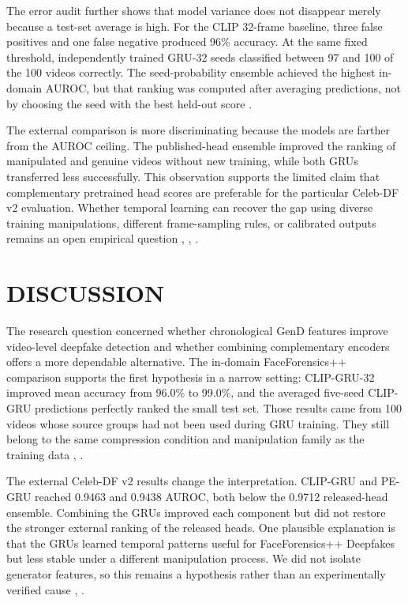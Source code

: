\documentclass[conference,10pt]{IEEEtran}
\begin{document}
The error audit further shows that model variance does not disappear merely because a test-set average is high. For the CLIP 32-frame baseline, three false positives and one false negative produced 96\% accuracy. At the same fixed threshold, independently trained GRU-32 seeds classified between 97 and 100 of the 100 videos correctly. The seed-probability ensemble achieved the highest in-domain AUROC, but that ranking was computed after averaging predictions, not by choosing the seed with the best held-out score \cite{capstone2026}.

The external comparison is more discriminating because the models are farther from the AUROC ceiling. The published-head ensemble improved the ranking of manipulated and genuine videos without new training, while both GRUs transferred less successfully. This observation supports the limited claim that complementary pretrained head scores are preferable for the particular Celeb-DF v2 evaluation. Whether temporal learning can recover the gap using diverse training manipulations, different frame-sampling rules, or calibrated outputs remains an open empirical question \cite{yermakov2026}, \cite{li2020}, \cite{capstone2026}.

\FloatBarrier
\clearpage
\section{DISCUSSION}
The research question concerned whether chronological GenD features improve video-level deepfake detection and whether combining complementary encoders offers a more dependable alternative. The in-domain FaceForensics++ comparison supports the first hypothesis in a narrow setting: CLIP-GRU-32 improved mean accuracy from 96.0\% to 99.0\%, and the averaged five-seed CLIP-GRU predictions perfectly ranked the small test set. Those results came from 100 videos whose source groups had not been used during GRU training. They still belong to the same compression condition and manipulation family as the training data \cite{rossler2019}, \cite{capstone2026}.

The external Celeb-DF v2 results change the interpretation. CLIP-GRU and PE-GRU reached 0.9463 and 0.9438 AUROC, both below the 0.9712 released-head ensemble. Combining the GRUs improved each component but did not restore the stronger external ranking of the released heads. One plausible explanation is that the GRUs learned temporal patterns useful for FaceForensics++ Deepfakes but less stable under a different manipulation process. We did not isolate generator features, so this remains a hypothesis rather than an experimentally verified cause \cite{li2020}, \cite{capstone2026}.
\end{document}

